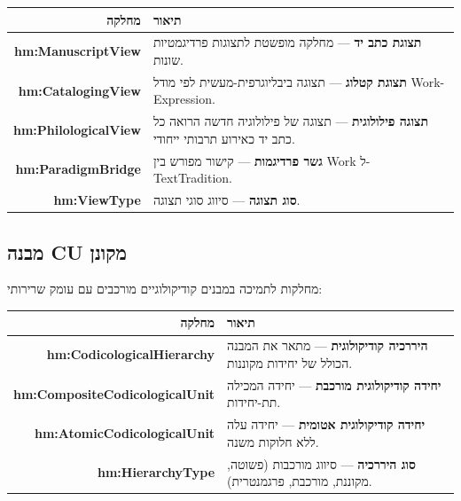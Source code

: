\documentclass[12pt,a4paper]{article}
\newcommand{\new}[1]{\textcolor{newaddition}{#1}}
\newcommand{\newclass}[1]{\textcolor{newaddition}{\textbf{#1}}}
\begin{document}
\begin{longtable}{|r|p{10cm}|}
\hline
\textbf{מחלקה} & \textbf{תיאור} \\
\hline
\endhead

\newclass{hm:ManuscriptView} & 
\new{\textbf{תצוגת כתב יד} — מחלקה מופשטת לתצוגות פרדיגמטיות שונות.}\\
\hline

\newclass{hm:CatalogingView} & 
\new{\textbf{תצוגת קטלוג} — תצוגה ביבליוגרפית-מעשית לפי מודל Work-Expression.}\\
\hline

\newclass{hm:PhilologicalView} & 
\new{\textbf{תצוגה פילולוגית} — תצוגה של פילולוגיה חדשה הרואה כל כתב יד כאירוע תרבותי ייחודי.}\\
\hline

\newclass{hm:ParadigmBridge} & 
\new{\textbf{גשר פרדיגמות} — קישור מפורש בין Work ל-TextTradition.}\\
\hline

\newclass{hm:ViewType} & 
\new{\textbf{סוג תצוגה} — סיווג סוגי תצוגה.}\\
\hline
\end{longtable}

\subsection{\new{  מבנה CU מקונן}}

מחלקות לתמיכה במבנים קודיקולוגיים מורכבים עם עומק שרירותי:

\begin{longtable}{|r|p{10cm}|}
\hline
\textbf{מחלקה} & \textbf{תיאור} \\
\hline
\endhead

\newclass{hm:CodicologicalHierarchy} & 
\new{\textbf{היררכיה קודיקולוגית} — מתאר את המבנה הכולל של יחידות מקוננות.}\\
\hline

\newclass{hm:CompositeCodicologicalUnit} & 
\new{\textbf{יחידה קודיקולוגית מורכבת} — יחידה המכילה תת-יחידות.}\\
\hline

\newclass{hm:AtomicCodicologicalUnit} & 
\new{\textbf{יחידה קודיקולוגית אטומית} — יחידה עלה ללא חלוקות משנה.}\\
\hline

\newclass{hm:HierarchyType} & 
\new{\textbf{סוג היררכיה} — סיווג מורכבות (פשוטה, מקוננת, מורכבת, פרגמנטרית).}\\
\hline
\end{longtable}
\end{document}

